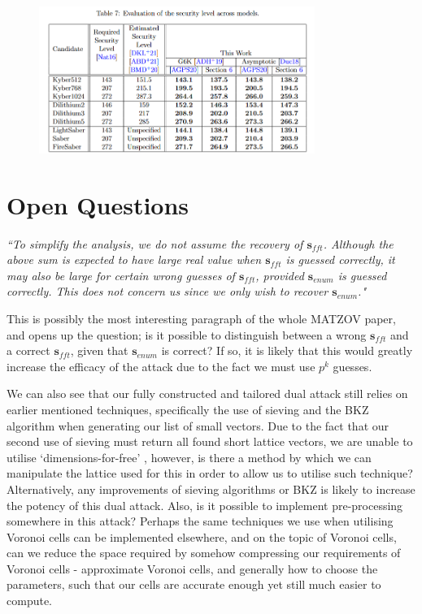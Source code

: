 \documentclass[a4paper, 10pt]{article}
\theoremstyle{definition}
\begin{document}
\begin{figure}[H]
    \centering
    \includegraphics[width=0.8\textwidth]{matzov_results_3.png}
\end{figure}

\newpage

\section{Open Questions}
\textit{``To simplify the analysis, we do not assume the recovery of $\mathbf{s}_{fft}$. Although the above sum is expected to have large real value when $\mathbf{s}_{fft}$ is guessed correctly, it may also be large for certain wrong guesses of $\mathbf{s}_{fft}$, provided $\mathbf{s}_{enum}$ is guessed correctly. This does not concern us since we only wish to recover $\mathbf{s}_{enum}$."} \cite{matzov_2022_6412487}


This is possibly the most interesting paragraph of the whole MATZOV paper, and opens up the question; is it possible to distinguish between a wrong $\mathbf{s}_{fft}$ and a correct $\mathbf{s}_{fft}$, given that $\mathbf{s}_{enum}$ is correct? If so, it is likely that this would greatly increase the efficacy of the attack due to the fact we must use $p^k$ guesses.

We can also see that our fully constructed and tailored dual attack still relies on earlier mentioned techniques, specifically the use of sieving and the \ac{BKZ} algorithm when generating our list of small vectors. Due to the fact that our second use of sieving must return all found short lattice vectors, we are unable to utilise `dimensions-for-free' \cite{inbook}, however, is there a method by which we can manipulate the lattice used for this in order to allow us to utilise such technique? Alternatively, any improvements of sieving algorithms or \ac{BKZ} is likely to increase the potency of this dual attack. Also, is it possible to implement pre-processing somewhere in this attack? Perhaps the same techniques we use when utilising Voronoi cells can be implemented elsewhere, and on the topic of Voronoi cells, can we reduce the space required by somehow compressing our requirements of Voronoi cells - approximate Voronoi cells, and generally how to choose the parameters, such that our cells are accurate enough yet still much easier to compute.
\end{document}
